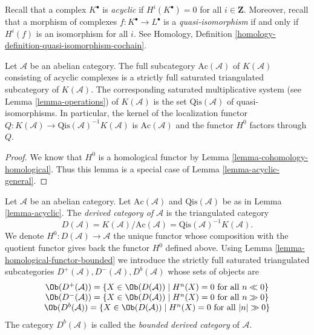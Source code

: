\medskip\noindent
Recall that a complex $K^\bullet$ is {\it acyclic} if $H^i(K^\bullet) = 0$
for all $i \in \mathbf{Z}$. Moreover, recall that a morphism of complexes
$f : K^\bullet \to L^\bullet$ is a {\it quasi-isomorphism} if and only if
$H^i(f)$ is an isomorphism for all $i$. See
Homology, Definition \ref{homology-definition-quasi-isomorphism-cochain}.

\begin{lemma}
\label{lemma-acyclic}
Let $\mathcal{A}$ be an abelian category. The full subcategory
$\text{Ac}(\mathcal{A})$ of $K(\mathcal{A})$ consisting of acyclic complexes
is a strictly full saturated triangulated subcategory of $K(\mathcal{A})$.
The corresponding saturated multiplicative system (see
Lemma \ref{lemma-operations})
of $K(\mathcal{A})$ is the set $\text{Qis}(\mathcal{A})$
of quasi-isomorphisms. In particular, the kernel of the localization
functor $Q : K(\mathcal{A}) \to \text{Qis}(\mathcal{A})^{-1}K(\mathcal{A})$
is $\text{Ac}(\mathcal{A})$ and the functor $H^0$ factors through $Q$.
\end{lemma}

\begin{proof}
We know that $H^0$ is a homological functor by
Lemma \ref{lemma-cohomology-homological}.
Thus this lemma is a special case of
Lemma \ref{lemma-acyclic-general}.
\end{proof}

\begin{definition}
\label{definition-unbounded-derived-category}
Let $\mathcal{A}$ be an abelian category.
Let $\text{Ac}(\mathcal{A})$ and $\text{Qis}(\mathcal{A})$
be as in
Lemma \ref{lemma-acyclic}.
The {\it derived category of $\mathcal{A}$} is the triangulated
category
$$
D(\mathcal{A}) =
K(\mathcal{A})/\text{Ac}(\mathcal{A}) =
\text{Qis}(\mathcal{A})^{-1} K(\mathcal{A}).
$$
We denote $H^0 : D(\mathcal{A}) \to \mathcal{A}$ the unique functor
whose composition with the quotient functor gives back the functor
$H^0$ defined above. Using
Lemma \ref{lemma-homological-functor-bounded}
we introduce the strictly full saturated triangulated subcategories
$D^{+}(\mathcal{A}), D^{-}(\mathcal{A}), D^b(\mathcal{A})$
whose sets of objects are
$$
\begin{matrix}
\Ob(D^{+}(\mathcal{A})) =
\{X \in \Ob(D(\mathcal{A})) \mid
H^n(X) = 0\text{ for all }n \ll 0\} \\
\Ob(D^{-}(\mathcal{A})) =
\{X \in \Ob(D(\mathcal{A})) \mid
H^n(X) = 0\text{ for all }n \gg 0\} \\
\Ob(D^b(\mathcal{A})) =
\{X \in \Ob(D(\mathcal{A})) \mid
H^n(X) = 0\text{ for all }|n| \gg 0\}
\end{matrix}
$$
The category $D^b(\mathcal{A})$ is called the {\it bounded derived
category} of $\mathcal{A}$.
\end{definition}

